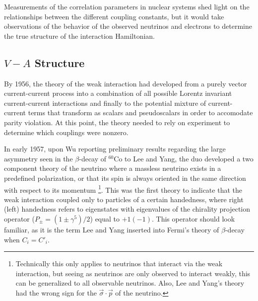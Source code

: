 Measurements of the correlation parameters in nuclear systems shed light on the
relationships between the different coupling constants, but it would take observations
of the behavior of the observed neutrinos and electrons to determine the true structure
of the interaction Hamiltonian.

\subsection{$V-A$ Structure}

By 1956, the theory of the weak interaction had developed from a purely vector current-current
process into
a combination of all possible Lorentz invariant current-current interactions and finally to the potential mixture
of current-current terms that transform as scalars and pseudoscalars in order to accomodate
parity violation. At this point, the theory needed to rely on experiment to determine
which couplings were nonzero.

In early 1957, upon Wu reporting preliminary results regarding the large asymmetry seen in the $\beta$-decay
of $^{60}\mathrm{Co}$ to Lee and Yang, the duo developed a two component theory
of the neutrino where a massless neutrino exists in a predefined polarization, or that
its spin is always oriented in the same direction with respect to its momentum \cite{lee1957}
\footnote{Technically this only applies to neutrinos that interact via
  the weak interaction, but seeing as neutrinos are only
  observed to interact weakly, this can be generalized to all observable neutrinos. Also, Lee and
  Yang's theory had the wrong sign for the $\vec{\sigma} \cdot \vec{p}$ of the neutrino.}.
This was the first theory to indicate that the weak interaction coupled only to particles
of a certain handedness, where right (left) handedness refers to eigenstates with eigenvalues of the
chirality projection operator ($P_{\pm} = (1\pm \gamma^5)/2$) equal to $+1\mathrm{ }(-1)$. This operator
should look familiar, as it is the term Lee and Yang inserted into Fermi's theory of $\beta$-decay
when $C_i=C'_i$. 

